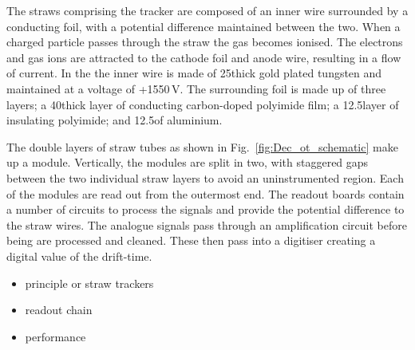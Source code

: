 The straws comprising the tracker are composed of an inner wire surrounded by a conducting foil, with a potential difference maintained between the two. When a charged particle passes through the straw the gas becomes ionised. The electrons and gas ions are attracted to the cathode foil and anode wire, resulting in a flow of current. In the \ot the inner wire is made of 25\mum thick gold plated tungsten and maintained at a voltage of +1550\,V. The surrounding foil is made up of three layers; a 40\mum thick layer of conducting carbon-doped polyimide film; a 12.5\mum layer of insulating polyimide; and 12.5\mum of aluminium. 

The double layers of straw tubes as shown in Fig.~\ref{fig:Dec_ot_schematic} make up a module. Vertically, the modules are split in two, with staggered gaps between the two individual straw layers to avoid an uninstrumented region. Each of the modules are read out from the outermost end. 
The readout boards contain a number of circuits to process the signals and provide the potential difference to the straw wires.
The analogue signals pass through an amplification circuit before being are processed and cleaned. These then pass into a digitiser creating a digital value of the drift-time.   


{\color{Red}
\begin{itemize}
\item principle or straw trackers
\item readout chain
\item performance
\end{itemize}
}




